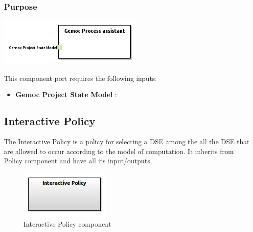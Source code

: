 \documentclass{gemoc} %
\begin{document}
\subsubsection{Purpose}

\begin{center}
\includegraphics*[trim=0.0cm 0.0cm 0cm 0.0cm, clip=true]{../images/generated/Generated_Gemoc_Process_assistant.png}
\end{center}

This component port requires the following inputs:
\begin{itemize}
  \item \textbf{Gemoc Project State Model} :
\end{itemize}


\subsection{Interactive Policy}
The Interactive Policy is a policy for selecting a DSE among the all the DSE that are allowed to occur according to the model of computation.
It inherits from Policy component and have all its input/outputs.
\begin{figure}[htp]
	\begin{center}
	\includegraphics*[trim=0.0cm 0.0cm 0cm 0.0cm, clip=true, scale=1.0]{../images/generated/Generated_Interactive Policy.jpg}
	\caption{Interactive Policy component}
	\end{center}
\end{figure}
\end{document}
